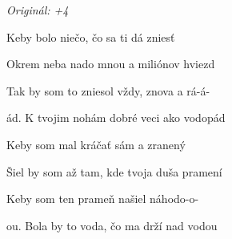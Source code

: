 \begin{song}


\begin{headerbox}
\end{headerbox}

\begin{strumbox}
\begin{headerbox}
\textit{Originál: +4}
\end{headerbox}
\end{strumbox}

\begin{hchordbox}
\end{hchordbox}

\bigskip


 Keby bolo niečo,  čo sa ti dá zniesť \par
{} Okrem neba nado mnou a  miliónov hviezd  \par
{} Tak by som to zniesol  vždy, znova a rá-á- \par
{}ád. K tvojim nohám dobré veci  ako vodopád  \par
{} \par

\bigskip

 Keby som mal kráčať  sám a zranený \par
{} Šiel by som až tam, kde tvoja duša pramení  \par
{} Keby som ten prameň  našiel náhodo-o- \par
{}ou. Bola by to voda, čo ma drží nad vodou  \par
{} \par

\bigskip


\end{song}
